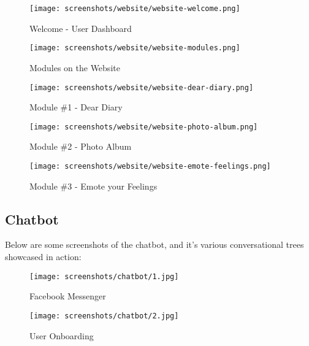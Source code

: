 \begin{figure}[H]
    \centering
    \texttt{[image: screenshots/website/website-welcome.png]}
    \caption{Welcome - User Dashboard}
\end{figure}
\vspace*{\fill}

\pagebreak

\vspace*{\fill}
\begin{figure}[H]
    \centering
    \texttt{[image: screenshots/website/website-modules.png]}
    \caption{Modules on the Website}
\end{figure}

\begin{figure}[H]
    \centering
    \texttt{[image: screenshots/website/website-dear-diary.png]}
    \caption{Module \#1 - Dear Diary}
\end{figure}
\vspace*{\fill}

\pagebreak

\vspace*{\fill}
\begin{figure}[H]
    \centering
    \texttt{[image: screenshots/website/website-photo-album.png]}
    \caption{Module \#2 - Photo Album}
\end{figure}

\begin{figure}[H]
    \centering
    \texttt{[image: screenshots/website/website-emote-feelings.png]}
    \caption{Module \#3 - Emote your Feelings}
\end{figure}
\vspace*{\fill}

\pagebreak

\subsection{Chatbot}

\noindent
Below are some screenshots of the chatbot, and it’s various conversational trees showcased in action:

\vspace*{\fill}
\begin{figure}[H]
    \centering
    \begin{minipage}{0.45\textwidth}
        \centering
        \texttt{[image: screenshots/chatbot/1.jpg]}
        \caption{Facebook Messenger}
    \end{minipage}\hfill
    \begin{minipage}{0.45\textwidth}
        \centering
        \texttt{[image: screenshots/chatbot/2.jpg]}
        \caption{User Onboarding}
    \end{minipage}
\end{figure}
\vspace*{\fill}


